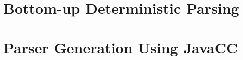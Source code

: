 \documentclass[8pt,a4paper,compress]{beamer}
\begin{document}
\section{Bottom-up Deterministic Parsing}
\begin{frame}[fragile]
\pause

\end{frame}

\section{Parser Generation Using JavaCC}
\begin{frame}[fragile]
\pause

\end{frame}
\end{document}
